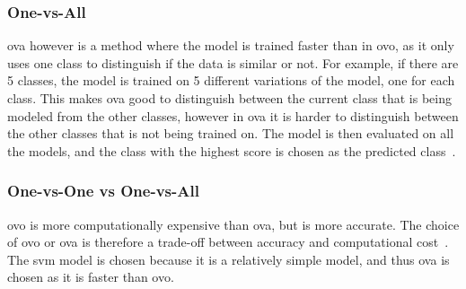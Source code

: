 \subsubsection{One-vs-All}\label{subsubsec:one-vs-all}
\gls{ova} however is a method where the model is trained faster than in \gls{ovo}, as it only uses one class to distinguish if the data is similar or not. For example, if there are 5 classes, the model is trained on 5 different variations of the model, one for each class. This makes \gls{ova} good to distinguish between the current class that is being modeled from the other classes, however in \gls{ova} it is harder to distinguish between the other classes that is not being trained on. The model is then evaluated on all the models, and the class with the highest score is chosen as the predicted class~\cite{james-statistical-learning}.
\subsubsection{One-vs-One vs One-vs-All}\label{subsubsec:one-vs-one-vs-one-vs-all}
\gls{ovo} is more computationally expensive than \gls{ova}, but is more accurate. The choice of \gls{ovo} or \gls{ova} is therefore a trade-off between accuracy and computational cost~\cite{james-statistical-learning}. The \gls{svm} model is chosen because it is a relatively simple model, and thus \gls{ova} is chosen as it is faster than \gls{ovo}.


